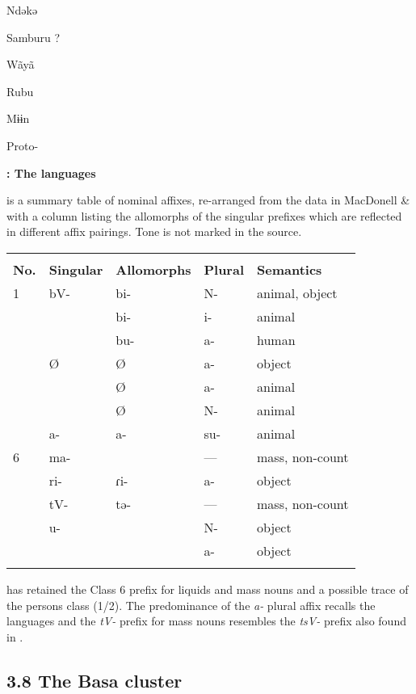 \documentclass[output=paper]{langsci/langscibook}
\begin{document}
Ndəkə



Samburu ?



Wãyã



Rubu



Mɨɨn


Proto-

\textbf{: The  languages}

 is a summary table of  nominal affixes, re-arranged from the data in MacDonell \& \citet{Smith2004} with a column listing the allomorphs of the singular prefixes which are reflected in different affix pairings. Tone is not marked in the source.

\begin{tabularx}{\textwidth}{XXXXX}
\lsptoprule
\multicolumn{5}{c}{\itshape \textbf{{\tabref{tab:key:22}:}}\textbf{ {\ili{Rin} nominal affixes}}}\\
\textbf{No.} & \textbf{Singular} & \textbf{Allomorphs} & \textbf{Plural} & \textbf{Semantics}\\
1 & bV- & bi- & N- &  animal, object\\
&  & bi- & i- &  animal\\
&  & bu- & a- &  human\\
& Ø & Ø & a- &  object\\
&  & Ø & a- &  animal\\
&  & Ø & N- &  animal\\
& a- & a- & su- &  animal\\
6 & ma- &  & — &  mass, non-count\\
& ri- & ɾi- & a- &  object\\
& tV- & tə- & — &  mass, non-count\\
& u- &  & N- &  object\\
&  &  & a- &  object\\
\lspbottomrule
\end{tabularx}
 has retained the  Class 6 prefix for liquids and mass nouns and a possible trace of the persons class (1/2). The predominance of the \textit{a-} plural affix recalls the  languages and the \textit{tV-} prefix for mass nouns resembles the \textit{tsV-} prefix also found in .

\subsection{{3.8 The Basa cluster}}
\end{document}
